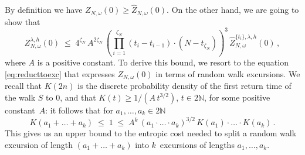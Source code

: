 \documentclass[reqno,11pt]{amsart}
\numberwithin{equation}{section}
\newcommand{\N}{\mathbb{N}}
\newcommand{\go}{\omega}
\newcommand{\gl}{\lambda}
\begin{document}
\proof
By definition we have $Z_{N,\go}(0) \ge \widehat{Z}_{N,\go}(0)$. On the other hand, we are going to show that
\begin{equation} \label{eq:rough_maj}
Z_{N,\go}^{\gl,h}(0) \;\le\; 4^{\zeta_N} \, A^{2\zeta_N} \, \left( \prod_{i=1}^{\zeta_N} (t_i-t_{i-1}) \cdot (N-t_{\zeta_N}) \right)^{3} \,  \widehat{Z}_{N,\go}^{\{t_i\},\gl,h}(0)\,,
\end{equation}
where $A$ is a positive constant. To derive this bound, we resort to the equation \eqref{eq:reducttoexc} that expresses $Z_{N,\go}(0)$ in terms of random walk excursions. We recall that $K(2n)$ is the discrete probability density of the first return time of the walk $S$ to $0$, and that $K(t) \ge 1/(A\,t^{3/2})$, $t\in 2\N$, for some positive constant~$A$: it follows that for $a_1, \ldots, a_k \in 2\N$
\begin{equation} \label{eq:app_bound}
K(a_1 + \ldots + a_k) \; \le \; 1 \; \le \; A^k \, (a_1 \cdot \ldots \cdot a_k)^{3/2} \, K(a_1) \cdot \ldots \cdot K(a_k)\,.
\end{equation}
This gives us an upper bound to the entropic cost needed to split a random walk excursion of length $(a_1 + \ldots + a_k)$ into $k$~excursions of lengths $a_1, \ldots, a_k$.
\end{document}
